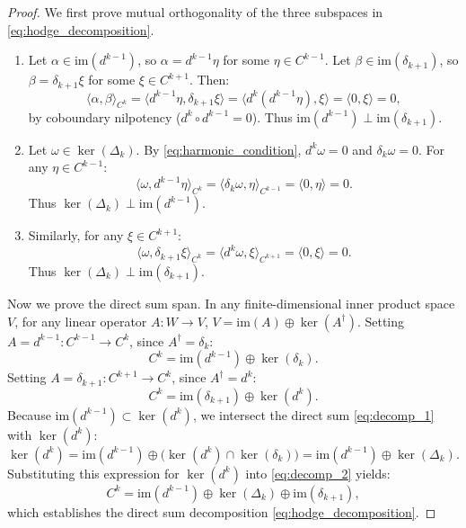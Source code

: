 \begin{proof}
We first prove mutual orthogonality of the three subspaces in \eqref{eq:hodge_decomposition}.
\begin{enumerate}
    \item Let $\alpha \in \mathrm{im}(d^{k-1})$, so $\alpha = d^{k-1} \eta$ for some $\eta \in C^{k-1}$. Let $\beta \in \mathrm{im}(\delta_{k+1})$, so $\beta = \delta_{k+1} \xi$ for some $\xi \in C^{k+1}$. Then:
    \begin{equation}
    \langle \alpha, \beta \rangle_{C^k} = \langle d^{k-1} \eta, \delta_{k+1} \xi \rangle = \langle d^k (d^{k-1} \eta), \xi \rangle = \langle 0, \xi \rangle = 0,
    \end{equation}
    by coboundary nilpotency ($d^k \circ d^{k-1} = 0$). Thus $\mathrm{im}(d^{k-1}) \perp \mathrm{im}(\delta_{k+1})$.
    
    \item Let $\omega \in \ker(\Delta_k)$. By \eqref{eq:harmonic_condition}, $d^k \omega = 0$ and $\delta_k \omega = 0$. For any $\eta \in C^{k-1}$:
    \begin{equation}
    \langle \omega, d^{k-1} \eta \rangle_{C^k} = \langle \delta_k \omega, \eta \rangle_{C^{k-1}} = \langle 0, \eta \rangle = 0.
    \end{equation}
    Thus $\ker(\Delta_k) \perp \mathrm{im}(d^{k-1})$.
    
    \item Similarly, for any $\xi \in C^{k+1}$:
    \begin{equation}
    \langle \omega, \delta_{k+1} \xi \rangle_{C^k} = \langle d^k \omega, \xi \rangle_{C^{k+1}} = \langle 0, \xi \rangle = 0.
    \end{equation}
    Thus $\ker(\Delta_k) \perp \mathrm{im}(\delta_{k+1})$.
\end{enumerate}

Now we prove the direct sum span. In any finite-dimensional inner product space $V$, for any linear operator $A: W \to V$, $V = \mathrm{im}(A) \oplus \ker(A^\dagger)$.
Setting $A = d^{k-1}: C^{k-1} \to C^k$, since $A^\dagger = \delta_k$:
\begin{equation}
\label{eq:decomp_1}
C^k = \mathrm{im}(d^{k-1}) \oplus \ker(\delta_k).
\end{equation}
Setting $A = \delta_{k+1}: C^{k+1} \to C^k$, since $A^\dagger = d^k$:
\begin{equation}
\label{eq:decomp_2}
C^k = \mathrm{im}(\delta_{k+1}) \oplus \ker(d^k).
\end{equation}
Because $\mathrm{im}(d^{k-1}) \subset \ker(d^k)$, we intersect the direct sum \eqref{eq:decomp_1} with $\ker(d^k)$:
\begin{equation}
\ker(d^k) = \mathrm{im}(d^{k-1}) \oplus \bigl( \ker(d^k) \cap \ker(\delta_k) \bigr) = \mathrm{im}(d^{k-1}) \oplus \ker(\Delta_k).
\end{equation}
Substituting this expression for $\ker(d^k)$ into \eqref{eq:decomp_2} yields:
\begin{equation}
C^k = \mathrm{im}(d^{k-1}) \oplus \ker(\Delta_k) \oplus \mathrm{im}(\delta_{k+1}),
\end{equation}
which establishes the direct sum decomposition \eqref{eq:hodge_decomposition}.


\end{proof}
